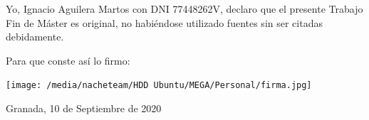 \begin{titlepage}
\begin{minipage}{\textwidth}
\vspace{60px}

Yo, Ignacio Aguilera Martos con DNI 77448262V, declaro que el presente Trabajo Fin de Máster es original, no habiéndose utilizado fuentes sin ser citadas debidamente.

Para que conste así lo firmo:

\texttt{[image: /media/nacheteam/HDD Ubuntu/MEGA/Personal/firma.jpg]}

Granada, 10 de Septiembre de 2020
\end{minipage}
\end{titlepage}


